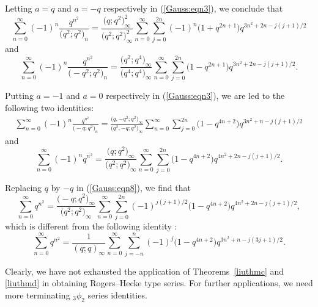 \documentclass[10pt,a4paper]{amsart}
\numberwithin{equation}{section}
\begin{document}
Letting $a=q$ and $a=-q$ respectively in (\ref{Gauss:eqn3}), we conclude that
\begin{equation*}%
\sum_{n=0}^\infty (-1)^n\frac{q^{n^2}}{\bigl(q^2; q^2\bigr)_n}
=\frac{\bigl(q; q^2\bigr)_\infty^2}{\bigl(q^2; q^2\bigr)^2_\infty}
\sum_{n=0}^\infty \sum_{j=0}^{2n} (-1)^n \bigl(1+q^{2n+1}\bigr) q^{3n^2+2n-j(j+1)/2}
\end{equation*}
and
\begin{equation*}%
	\sum_{n=0}^\infty (-1)^n\frac{q^{n^2}}{\bigl(-q^2; q^2\bigr)_n}
	=\frac{\bigl(q^2; q^4\bigr)_\infty }{\bigl(q^4; q^4\bigr)_\infty}
	\sum_{n=0}^\infty \sum_{j=0}^{2n} \bigl(1-q^{2n+1}\bigr) q^{3n^2+2n-j(j+1)/2}.
\end{equation*}

Putting $a=-1$ and $a=0$ respectively in (\ref{Gauss:eqn3}), we are led to the following two identities:
\begin{align*}%
\sum_{n=0}^\infty (-1)^n\frac{q^{n^2}}{\bigl(-q; q^2\bigr)_n}
=\frac{\bigl(q, -q^2; q^2\bigr)_\infty }{\bigl(q^2, -q; q^2\bigr)_\infty}
\sum_{n=0}^\infty \sum_{j=0}^{2n} \bigl(1-q^{4n+2}\bigr) q^{3n^2+n-j(j+1)/2}
\end{align*}
and
\begin{equation}\label{Gauss:eqn8}
\sum_{n=0}^\infty (-1)^n q^{n^2}
=\frac{\bigl(q; q^2\bigr)_\infty}{\bigl(q^2; q^2\bigr)_\infty}
\sum_{n=0}^\infty \sum_{j=0}^{2n} \bigl(1-q^{4n+2}\bigr) q^{4n^2+2n-j(j+1)/2}.
\end{equation}

Replacing $q$ by $-q$ in (\ref{Gauss:eqn8}), we find that
\begin{equation*}%
	\sum_{n=0}^\infty q^{n^2}
	=\frac{\bigl(-q; q^2\bigr)_\infty}{\bigl(q^2; q^2\bigr)_\infty}
	\sum_{n=0}^\infty \sum_{j=0}^{2n} (-1)^{j(j+1)/2}\bigl(1-q^{4n+2}\bigr) q^{4n^2+2n-j(j+1)/2},
\end{equation*}
which is different from the following identity \cite[Proposition~6.11]{Liu2013RamanJ}:
\begin{equation*}%
\sum_{n=0}^\infty q^{n^2}
=\frac{1}{(q; q)_\infty}
\sum_{n=0}^\infty \sum_{j=-n}^{n} (-1)^{j}\bigl(1-q^{4n+2}\bigr) q^{3n^2+n-j(3j+1)/2}.
\end{equation*}

Clearly, we have not exhausted the application of Theorems~\ref{liuthmc} and \ref{liuthmd} in obtaining Rogers--Hecke type series. For further applications,
we need more terminating ${}_3\phi_2$ series identities.
\end{document}
